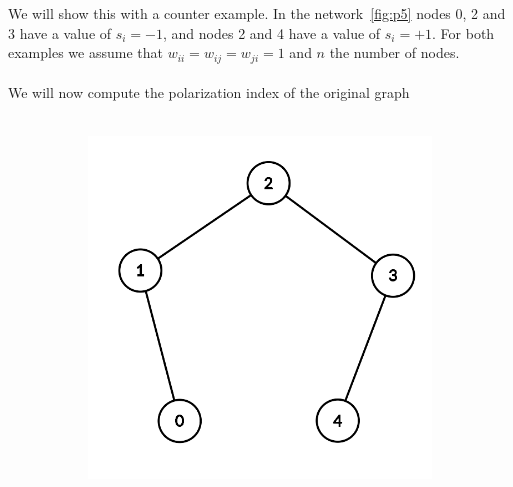 \vspace{20pt}
\noindent We will  show this with a counter example. In the network~\ref{fig:p5} nodes 0, 2 and 3 have a value of $s_i=-1$, and nodes 2 and 4 have a value of $s_i=+1$. For both examples we assume that $w_{ii}=w_{ij}=w_{ji}=1$ and $n$ the number of nodes.
\\
\\
We will now compute the polarization index of the original graph
\\
\\
\begin{figure}[h]
	\centering
	\begin{subfigure}[t]{0.3\textwidth}
		\centering
		\includegraphics[height=0.15\textheight]{Figures/p5A}
		\caption{}
		\label{subfig:monotonicityA}
	\end{subfigure}
	\hfill
	\begin{subfigure}[t]{0.3\textwidth}
		\centering

\end{subfigure}
\end{figure}
